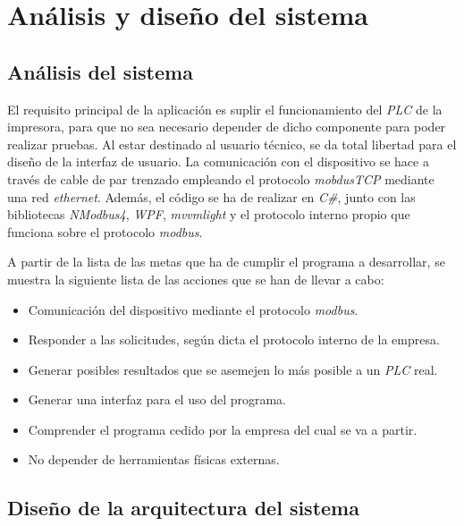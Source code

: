 \documentclass[pdftex,11pt,a4paper]{book}
\begin{document}
\chapter{Análisis y diseño del sistema}

\section{Análisis del sistema}

El requisito principal de la aplicación es suplir el funcionamiento del \emph{PLC} de la impresora, para que no sea necesario depender de dicho componente para poder realizar pruebas. Al estar destinado al usuario técnico, se da total libertad para el diseño de la interfaz de usuario. La comunicación con el dispositivo se hace a través de cable de par trenzado empleando el protocolo \textit{mobdusTCP} mediante una red \emph{ethernet}. Además, el código se ha de realizar en \emph{C\#}, junto con las bibliotecas \emph{NModbus4}, \emph{WPF}, \emph{mvvmlight} y el protocolo interno propio que funciona sobre el protocolo \emph{modbus}.

A partir de la lista de las metas que ha de cumplir el programa a desarrollar, se muestra la siguiente lista de las acciones que se han de llevar a cabo:

\begin{itemize}
\item Comunicación del dispositivo mediante el protocolo \emph{modbus}.
\item Responder a las solicitudes, según dicta el protocolo interno de la empresa.
\item Generar posibles resultados que se asemejen lo más posible a un \emph{PLC} real.
\item Generar una interfaz para el uso del programa.
\item Comprender el programa cedido por la empresa del cual se va a partir.
\item No depender de herramientas físicas externas.
\end{itemize}

\section{Diseño de la arquitectura del sistema}
\end{document}
